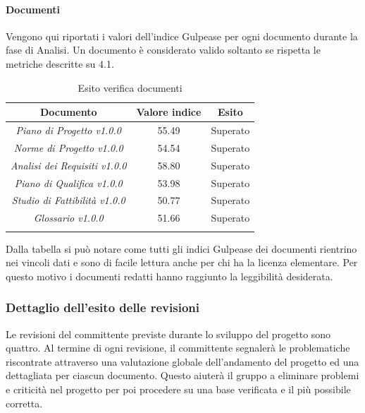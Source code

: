 \paragraph{Documenti} \Spazio
Vengono qui riportati i valori dell’indice Gulpease per ogni documento durante la fase
di Analisi. Un documento è considerato valido soltanto se rispetta le metriche descritte
su 4.1.
\begin{longtable}{|c|c|c|}
\hline
\textbf{Documento} & \textbf{Valore indice} & \textbf{Esito} \\
\hline
	\emph{Piano di Progetto v1.0.0} & {55.49} & {Superato}\\
\hline
	\emph{Norme di Progetto v1.0.0} & {54.54} & {Superato}\\
\hline
	\emph{Analisi dei Requisiti v1.0.0} & {58.80} & {Superato}\\
\hline
	\emph{Piano di Qualifica v1.0.0} & {53.98} & {Superato}\\
\hline
	\emph{Studio di Fattibilità v1.0.0} & {50.77} & {Superato}\\
\hline
	\emph{Glossario v1.0.0} & {51.66} & {Superato}\\
\hline
\caption[Esiti verifica documenti, Analisi]{Esito verifica documenti}
\label{tabella:verifica documenti}
\endhead
\end{longtable}
Dalla tabella si può notare come tutti gli indici Gulpease dei documenti rientrino nei vincoli dati e sono di facile lettura anche per chi ha la licenza elementare. Per questo motivo i documenti redatti hanno raggiunto la leggibilità desiderata.
\subsubsection{Dettaglio dell’esito delle revisioni}
Le revisioni del committente previste durante lo sviluppo del progetto sono quattro.
Al termine di ogni revisione, il committente segnalerà le problematiche riscontrate attraverso una valutazione globale dell'andamento del progetto ed una dettagliata per ciascun documento. 
Questo aiuterà il gruppo a eliminare problemi e criticità nel progetto per poi procedere su una base verificata e il più possibile corretta.
\pagebreak